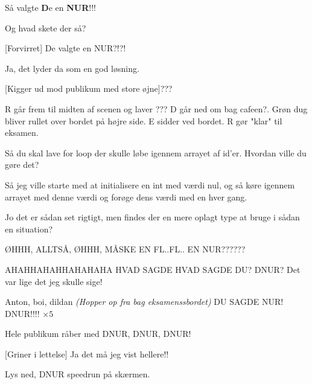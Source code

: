 \documentclass{article}
\begin{document}
\begin{sketch}
Så valgte \textbf{D}e en \textbf{NUR}!!!

Og hvad skete der så?

[Forvirret]
De valgte en NUR?!?!

Ja, det lyder da som en god løsning.

[Kigger ud mod publikum med store øjne]???

\scene{}
R går frem til midten af scenen og laver ???
D går ned om bag cafeen?. 
Grøn dug bliver rullet over bordet på højre side. E sidder ved bordet.
R gør "klar" til eksamen.

Så du skal lave for loop der skulle løbe igennem arrayet af id’er. Hvordan ville du gøre det?

Så jeg ville starte med at initialisere en int med værdi nul, og så køre igennem arrayet med denne værdi og forøge dens værdi med en hver gang.

Jo det er sådan set rigtigt, men findes der en mere oplagt type at bruge i sådan en situation?

ØHHH, ALLTSÅ, ØHHH, MÅSKE EN FL..FL.. EN NUR??????

AHAHHAHAHHAHAHAHA HVAD SAGDE HVAD SAGDE DU? DNUR? Det var lige det jeg skulle sige!

\scene{}
Anton, boi, dildan \textit{(Hopper op fra bag eksamenssbordet)}
DU SAGDE NUR! DNUR!!!! $\times 5$

\scene{}
Hele publikum råber med DNUR, DNUR, DNUR!

[Griner i lettelse]
Ja det må jeg vist hellere!!

 Lys ned, DNUR speedrun på skærmen.

\end{sketch}
\end{document}

